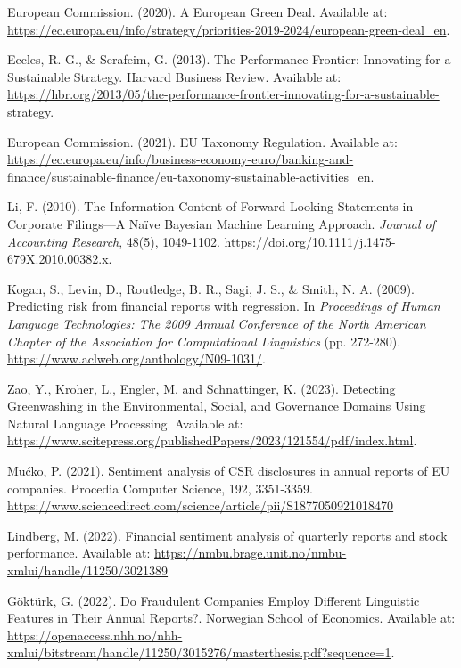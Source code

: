 \documentclass[times]{oupau}
\begin{document}
\begin{thebibliography}{9}

European Commission. (2020). A European Green Deal. Available at: \url{https://ec.europa.eu/info/strategy/priorities-2019-2024/european-green-deal_en}.


Eccles, R. G., \& Serafeim, G. (2013). The Performance Frontier: Innovating for a Sustainable Strategy. Harvard Business Review. Available at: \url{https://hbr.org/2013/05/the-performance-frontier-innovating-for-a-sustainable-strategy}.

European Commission. (2021). EU Taxonomy Regulation. Available at: \url{https://ec.europa.eu/info/business-economy-euro/banking-and-finance/sustainable-finance/eu-taxonomy-sustainable-activities_en}.

  Li, F. (2010). The Information Content of Forward-Looking Statements in Corporate Filings—A Naïve Bayesian Machine Learning Approach. \textit{Journal of Accounting Research}, 48(5), 1049-1102. \url{https://doi.org/10.1111/j.1475-679X.2010.00382.x}.

  Kogan, S., Levin, D., Routledge, B. R., Sagi, J. S., \& Smith, N. A. (2009). Predicting risk from financial reports with regression. In \textit{Proceedings of Human Language Technologies: The 2009 Annual Conference of the North American Chapter of the Association for Computational Linguistics} (pp. 272-280). \url{https://www.aclweb.org/anthology/N09-1031/}.

Zao, Y., Kroher, L., Engler, M. and Schnattinger, K. (2023). Detecting Greenwashing in the Environmental, Social, and Governance Domains Using Natural Language Processing. Available at: \url{https://www.scitepress.org/publishedPapers/2023/121554/pdf/index.html}.

Mućko, P. (2021). Sentiment analysis of CSR disclosures in annual reports of EU companies. Procedia Computer Science, 192, 3351-3359.
\url{https://www.sciencedirect.com/science/article/pii/S1877050921018470}



Lindberg, M. (2022). Financial sentiment analysis of quarterly reports and stock performance. Available at: \url{https://nmbu.brage.unit.no/nmbu-xmlui/handle/11250/3021389}

Göktürk, G. (2022). Do Fraudulent Companies Employ Different Linguistic Features in Their Annual Reports?. Norwegian School of Economics. Available at: \url{https://openaccess.nhh.no/nhh-xmlui/bitstream/handle/11250/3015276/masterthesis.pdf?sequence=1}.










\end{thebibliography}
\end{document}

